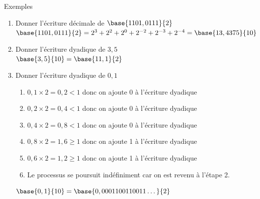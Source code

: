 \documentclass[10pt]{beamer}
\begin{document}
\begin{frame}{\Ctitle}{\stitle}
	\begin{exampleblock}{Exemples}
		\begin{enumerate}
			\item<1-> Donner l'écriture décimale de $\base{1101,0111}{2}$ \\
				\onslide<2-> \textcolor{OliveGreen}{$\base{1101,0111}{2} = 2^3+2^2+2^0+2^{-2}+2^{-3}+2^{-4} = \base{13,4375}{10}$}
			\item<3-> Donner l'écriture dyadique de $3,5$\\
				\onslide<4-> \textcolor{OliveGreen}{$\base{3,5}{10}=\base{11,1}{2}$}
            \item<5-> Donner l'écriture dyadique de $0,1$
				\onslide<6->
                    \begin{enumerate}
                    \item<7-> \textcolor{OliveGreen}{$0,1 \times 2 = 0,2 < 1$ donc on ajoute 0 à l'écriture dyadique }
                    \item<8-> \textcolor{OliveGreen}{$0,2 \times 2 = 0,4 < 1$ donc on ajoute 0 à l'écriture dyadique}
                    \item<9-> \textcolor{OliveGreen}{$0,4 \times 2 = 0,8 < 1$ donc on ajoute 0 à l'écriture dyadique}
                    \item<10->\textcolor{OliveGreen}{$0,8 \times 2 = 1,6 \geq 1$ donc on ajoute 1 à l'écriture dyadique}
                    \item<11->\textcolor{OliveGreen}{$0,6 \times 2 = 1,2 \geq 1$  donc on ajoute 1 à l'écriture dyadique}
                    \item<12->\textcolor{OliveGreen}{Le processus se poursuit indéfiniment car on est revenu à l'étape 2.}
                    \end{enumerate}
                \textcolor{OliveGreen}{$\base{0,1}{10} = \base{0,0001100110011\dots}{2}$}   
		\end{enumerate}

	\end{exampleblock}
\end{frame}
\end{document}
